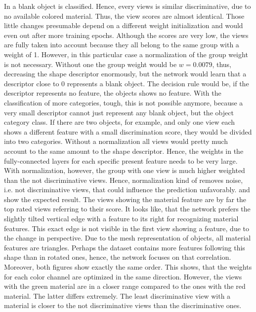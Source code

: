 In  a blank object is classified.
Hence, every views is similar discriminative, due to no available colored material.
Thus, the view scores are almost identical.
Those little changes presumable depend on a different weight initialization and would even out after more training epochs.
Although the scores are very low, the views are fully taken into account because they all belong to the same group with a weight of 1.
However, in this particular case a normalization of the group weight is not necessary.
Without one the group weight would be $w = 0.0079$, thus, decreasing the shape descriptor enormously, but the network would learn that a descriptor close to 0 represents a blank object.
The decision rule would be, if the descriptor represents no feature, the objects shows no feature.
With the classification of more categories, tough, this is not possible anymore, because a very small descriptor cannot just represent any blank object, but the object category class.
If there are two objects, for example, and only one view each shows a different feature with a small discrimination score, they would be divided into two categories.
Without a normalization all views would pretty much account to the same amount to the shape descriptor.
Hence, the weights in the fully-connected layers for each specific present feature needs to be very large.
With normalization, however, the group with one view is much higher weighted than the not discriminative views.
Hence, normalization kind of removes noise, i.e. not discriminative views, that could influence the prediction unfavorably.
 and  show the expected result.
The views showing the material feature are by far the top rated views referring to their score.
It looks like, that the network prefers the slightly tilted vertical edge with a feature to its right for recognizing material features.
This exact edge is not visible in the first view showing a feature, due to the change in perspective.
Due to the mesh representation of objects, all material features are triangles.
Perhaps the dataset contains more features following this shape than in rotated ones, hence, the network focuses on that correlation.
Moreover, both figures show exactly the same order.
This shows, that the weights for each color channel are optimized in the same direction.
However, the views with the green material are in a closer range compared to the ones with the red material.
The latter differs extremely.
The least discriminative view with a material is closer to the not discriminative views than the discriminative ones.
